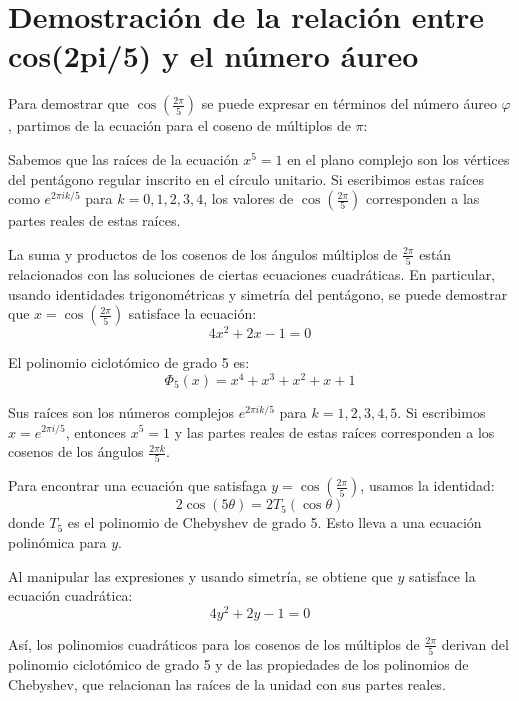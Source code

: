 \section{Demostración de la relación entre cos(2pi/5) y el número áureo}\label{sec:cosenoaureo}
Para demostrar que $\cos\left(\frac{2\pi}{5}\right)$ se puede expresar en términos del número áureo $\varphi$, partimos de la ecuación para el coseno de múltiplos de $\pi$:

Sabemos que las raíces de la ecuación $x^5 = 1$ en el plano complejo son los vértices del pentágono regular inscrito en el círculo unitario. Si escribimos estas raíces como $e^{2\pi i k/5}$ para $k=0,1,2,3,4$, los valores de $\cos\left(\frac{2\pi}{5}\right)$ corresponden a las partes reales de estas raíces.

La suma y productos de los cosenos de los ángulos múltiplos de $\frac{2\pi}{5}$ están relacionados con las soluciones de ciertas ecuaciones cuadráticas. En particular, usando identidades trigonométricas y simetría del pentágono, se puede demostrar que $x = \cos\left(\frac{2\pi}{5}\right)$ satisface la ecuación:
\begin{equation*}
4x^2 + 2x - 1 = 0
\end{equation*}

El polinomio ciclotómico de grado 5 es:
\begin{equation*}
\Phi_5(x) = x^4 + x^3 + x^2 + x + 1
\end{equation*}

Sus raíces son los números complejos $e^{2\pi i k/5}$ para $k=1,2,3,4,5$. Si escribimos $x = e^{2\pi i/5}$, entonces $x^5 = 1$ y las partes reales de estas raíces corresponden a los cosenos de los ángulos $\frac{2\pi k}{5}$.

Para encontrar una ecuación que satisfaga $y = \cos\left(\frac{2\pi}{5}\right)$, usamos la identidad:
\begin{equation*}
2\cos(5\theta) = 2T_5(\cos\theta)
\end{equation*}
donde $T_5$ es el polinomio de Chebyshev de grado 5. Esto lleva a una ecuación polinómica para $y$.

Al manipular las expresiones y usando simetría, se obtiene que $y$ satisface la ecuación cuadrática:
\begin{equation*}
4y^2 + 2y - 1 = 0
\end{equation*}

Así, los polinomios cuadráticos para los cosenos de los múltiplos de $\frac{2\pi}{5}$ derivan del polinomio ciclotómico de grado 5 y de las propiedades de los polinomios de Chebyshev, que relacionan las raíces de la unidad con sus partes reales.

